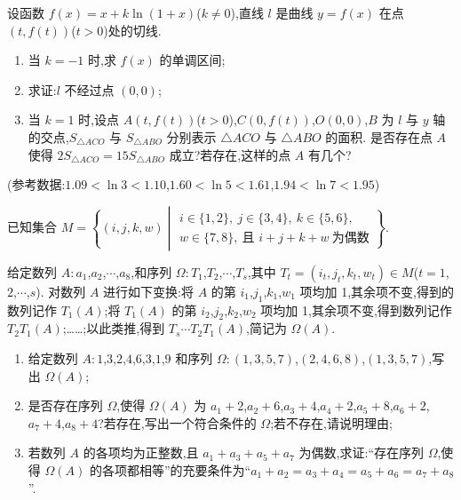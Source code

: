 \begin{problem}
设函数 \(f(x)=x+k\ln(1+x)\)(\(k\ne 0\)),直线 \(l\) 是曲线 \(y=f(x)\) 在点 \((t,f(t))\)(\(t>0\))处的切线.

\begin{enumerate}
\item 当 \(k=-1\) 时,求 \(f(x)\) 的单调区间;
\item 求证:\(l\) 不经过点 \((0,0)\);
\item 当 \(k=1\) 时,设点 \(A(t,f(t))\)(\(t>0\)),\(C(0,f(t))\),\(O(0,0)\),\(B\) 为 \(l\) 与 \(y\) 轴的交点,\(S_{\triangle ACO}\) 与 \(S_{\triangle ABO}\) 分别表示 \(\triangle ACO\) 与 \(\triangle ABO\) 的面积. 是否存在点 \(A\) 使得 \(2S_{\triangle ACO}=15S_{\triangle ABO}\) 成立?若存在,这样的点 \(A\) 有几个?
\end{enumerate}

(参考数据:\(1.09<\ln 3<1.10\),\(1.60<\ln 5<1.61\),\(1.94<\ln 7<1.95\))
\end{problem}

\begin{problem}
已知集合 \(M=\left\{(i,j,k,w)\middle|\begin{gathered}i\in\{1,2\},\ j\in\{3,4\},\ k\in\{5,6\},\\ w\in\{7,8\},\ \text{且 }i+j+k+w\ \text{为偶数}\end{gathered}\right\}\).

给定数列 \(A:a_1\),\(a_2\),\(\cdots\),\(a_8\),和序列 \(\Omega:T_1\),\(T_2\),\(\cdots\),\(T_s\),其中 \(T_t=(i_t,j_t,k_t,w_t)\in M\)(\(t=1\),\(2\),\(\cdots\),\(s\)). 对数列 \(A\) 进行如下变换:将 \(A\) 的第 \(i_1\),\(j_1\),\(k_1\),\(w_1\) 项均加 1,其余项不变,得到的数列记作 \(T_1(A)\);将 \(T_1(A)\) 的第 \(i_2\),\(j_2\),\(k_2\),\(w_2\) 项均加 1,其余项不变,得到数列记作 \(T_2T_1(A)\);……;以此类推,得到 \(T_s\cdots T_2T_1(A)\),简记为 \(\Omega(A)\).

\begin{enumerate}
\item 给定数列 \(A:1\),\(3\),\(2\),\(4\),\(6\),\(3\),\(1\),\(9\) 和序列 \(\Omega:(1,3,5,7)\),\((2,4,6,8)\),\((1,3,5,7)\),写出 \(\Omega(A)\);
\item 是否存在序列 \(\Omega\),使得 \(\Omega(A)\) 为 \(a_1+2\),\(a_2+6\),\(a_3+4\),\(a_4+2\),\(a_5+8\),\(a_6+2\),\(a_7+4\),\(a_8+4\)?若存在,写出一个符合条件的 \(\Omega\);若不存在,请说明理由;
\item 若数列 \(A\) 的各项均为正整数,且 \(a_1+a_3+a_5+a_7\) 为偶数,求证:``存在序列 \(\Omega\),使得 \(\Omega(A)\) 的各项都相等''的充要条件为``\(a_1+a_2=a_3+a_4=a_5+a_6=a_7+a_8\)''.
\end{enumerate}
\end{problem}

